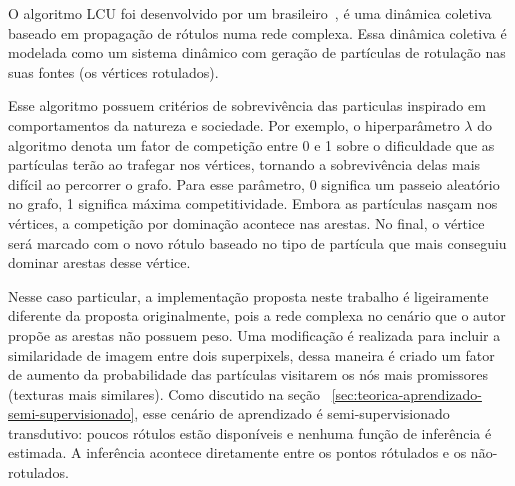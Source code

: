 O algoritmo \gls{LCU} foi desenvolvido por um
brasileiro~\cite{VerriNetworkUnfoldingMap2018}, é uma dinâmica
coletiva baseado em propagação de rótulos numa rede complexa. Essa
dinâmica coletiva é modelada como um sistema dinâmico com geração de
partículas de rotulação nas suas fontes (os vértices rotulados).

Esse algoritmo possuem critérios de sobrevivência das particulas
inspirado em comportamentos da natureza e sociedade. Por exemplo, o
hiperparâmetro $ \lambda $ do algoritmo denota um fator de competição entre
0 e 1 sobre o dificuldade que as partículas terão ao trafegar nos
vértices, tornando a sobrevivência delas mais difícil ao percorrer o
grafo. Para esse parâmetro, 0 significa um passeio aleatório no grafo,
1 significa máxima competitividade. Embora as partículas nasçam nos
vértices, a competição por dominação acontece nas arestas. No final, o
vértice será marcado com o novo rótulo baseado no tipo de partícula
que mais conseguiu dominar arestas desse vértice.

Nesse caso particular, a implementação proposta neste trabalho é
ligeiramente diferente da proposta originalmente, pois a rede complexa
no cenário que o autor propõe as arestas não possuem peso. Uma
modificação é realizada para incluir a similaridade de imagem entre
dois superpixels, dessa maneira é criado um fator de aumento da
probabilidade das partículas visitarem os nós mais promissores
(texturas mais similares). Como discutido na seção
~\ref{sec:teorica-aprendizado-semi-supervisionado}, esse cenário de
aprendizado é semi-supervisionado transdutivo: poucos rótulos estão
disponíveis e nenhuma função de inferência é estimada. A inferência
acontece diretamente entre os pontos rótulados e os não-rotulados.


